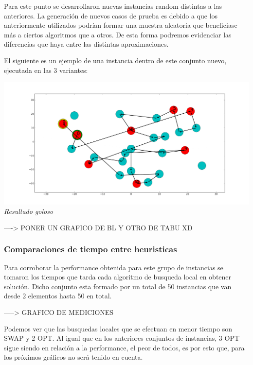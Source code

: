 Para este punto se desarrollaron nuevas instancias random distintas a las anteriores. La generación de nuevos casos de prueba es debido a que los anteriormente utilizados podrían formar una muestra aleatoria que beneficiase más a ciertos algoritmos que a otros. De esta forma podremos evidenciar las diferencias que haya entre las distintas aproximaciones.

El siguiente es un ejemplo de una instancia dentro de este conjunto nuevo, ejecutada en las 3 variantes:

\vspace*{0.3cm} \vspace*{0.3cm}
  \begin{center}
\includegraphics[scale=0.5]{./EJ5/caminoEjGoloso.png}
\\{\textit{Resultado goloso}}
  \end{center}
  \vspace*{0.3cm}
----> PONER UN GRAFICO DE BL Y OTRO DE TABU XD

\subsubsection{Comparaciones de tiempo entre heuristicas}

Para corroborar la performance obtenida para este grupo de instancias se tomaron los tiempos que tarda cada algoritmo de busqueda local en obtener soluci\'on. 
Dicho conjunto esta formado por un total de 50 instancias que van desde 2 elementos hasta 50 en total.

-----> GRAFICO DE MEDICIONES 

Podemos ver que las busquedas locales que se efectuan en menor tiempo son SWAP y 2-OPT. 
Al igual que en los anteriores conjuntos de instancias, 3-OPT sigue siendo en relaci\'on a la  performance, el peor de todos, es por esto que, para los pr\'oximos gr\'aficos no ser\'a tenido en cuenta.

